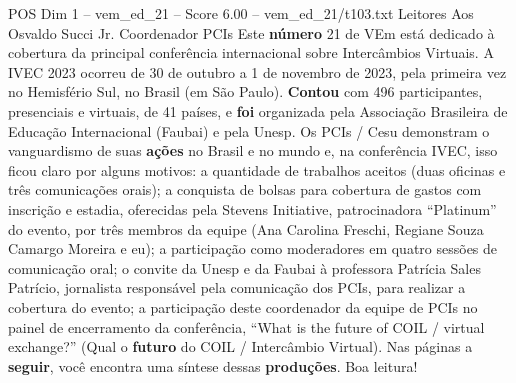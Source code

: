 \begin{textsample}{POS Dim 1 – vem\_ed\_21 – Score 6.00 – vem\_ed\_21/t103.txt}  \label{ex:f1_pos_169}
Leitores Aos Osvaldo Succi Jr.
Coordenador PCIs Este \textbf{número} 21 de VEm está dedicado à cobertura da principal conferência internacional sobre Intercâmbios Virtuais.
A IVEC 2023 ocorreu de 30 de outubro a 1 de novembro de 2023, pela primeira vez no Hemisfério Sul, no Brasil (em São Paulo). \textbf{Contou} com 496 participantes, presenciais e virtuais, de 41 países, e \textbf{foi} organizada pela Associação Brasileira de Educação Internacional (Faubai) e pela Unesp.
Os PCIs / Cesu demonstram o vanguardismo de suas \textbf{ações} no Brasil e no mundo e, na conferência IVEC, isso ficou claro por alguns motivos: a quantidade de trabalhos aceitos (duas oficinas e três comunicações orais); a conquista de bolsas para cobertura de gastos com inscrição e estadia, oferecidas pela Stevens Initiative, patrocinadora “Platinum” do evento, por três membros da equipe (Ana Carolina Freschi, Regiane Souza Camargo Moreira e eu); a participação como moderadores em quatro sessões de comunicação oral; o convite da Unesp e da Faubai à professora Patrícia Sales Patrício, jornalista responsável pela comunicação dos PCIs, para realizar a cobertura do evento; a participação deste coordenador da equipe de PCIs no painel de encerramento da conferência, “What is the future of COIL / virtual exchange?” (Qual o \textbf{futuro} do COIL / Intercâmbio Virtual).
Nas páginas a \textbf{seguir}, você encontra uma síntese dessas \textbf{produções}.
Boa leitura!

\end{textsample}
